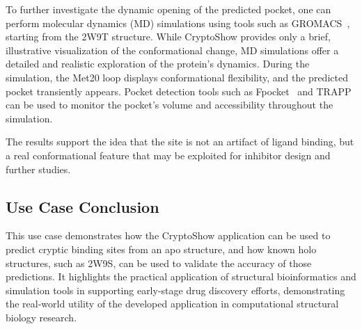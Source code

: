 To further investigate the dynamic opening of the predicted pocket, one can perform molecular dynamics (MD) simulations using tools such as GROMACS~\cite{van2005gromacs}, starting from the 2W9T structure. While CryptoShow provides only a brief, illustrative visualization of the conformational change, MD simulations offer a detailed and realistic exploration of the protein's dynamics. During the simulation, the Met20 loop displays conformational flexibility, and the predicted pocket transiently appears. Pocket detection tools such as Fpocket~\cite{le2009fpocket} and TRAPP~\cite{kokh2013trapp} can be used to monitor the pocket's volume and accessibility throughout the simulation.

The results support the idea that the site is not an artifact of ligand binding, but a real conformational feature that may be exploited for inhibitor design and further studies.

\subsection{Use Case Conclusion}
\label{subsec:use-case-conclusion}

This use case demonstrates how the CryptoShow application can be used to predict cryptic binding sites from an apo structure, and how known holo structures, such as 2W9S, can be used to validate the accuracy of those predictions. It highlights the practical application of structural bioinformatics and simulation tools in supporting early-stage drug discovery efforts, demonstrating the real-world utility of the developed application in computational structural biology research.
